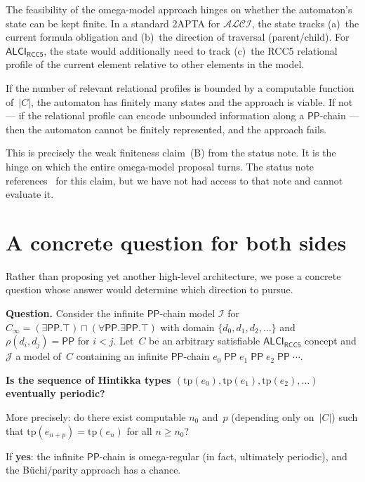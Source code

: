 \documentclass[11pt]{article}
\newcommand{\ALCIRCC}{\mathsf{ALCI}_{\mathsf{RCC5}}}
\newcommand{\ALCI}{\mathcal{ALCI}}
\newcommand{\Pp}{\mathsf{PP}}
\begin{document}
The feasibility of the omega-model approach hinges on whether the
automaton's state can be kept finite.  In a standard 2APTA for
$\ALCI$, the state tracks (a)~the current formula obligation and
(b)~the direction of traversal (parent\slash child).  For
$\ALCIRCC$, the state would additionally need to track (c)~the
RCC5 relational profile of the current element relative to other
elements in the model.

If the number of relevant relational profiles is bounded by a
computable function of~$|C|$, the automaton has finitely many
states and the approach is viable.  If not --- if the relational
profile can encode unbounded information along a $\Pp$-chain ---
then the automaton cannot be finitely represented, and the approach
fails.

This is precisely the weak finiteness claim~(B) from the status
note.  It is the hinge on which the entire omega-model proposal
turns.  The status note references~\cite{GPT2026Bound} for this
claim, but we have not had access to that note and cannot evaluate
it.

\section{A concrete question for both sides}

Rather than proposing yet another high-level architecture, we pose
a concrete question whose answer would determine which direction to
pursue.

\begin{mdframed}[backgroundcolor=lightaccent,linecolor=accent]
\textbf{Question.}\;
Consider the infinite $\Pp$-chain model $\mathcal{I}$ for
$C_\infty = (\exists\Pp.\top)\sqcap(\forall\Pp.\exists\Pp.\top)$
with domain $\{d_0, d_1, d_2, \ldots\}$ and $\rho(d_i,d_j) = \Pp$
for $i < j$.  Let~$C$ be an arbitrary satisfiable $\ALCIRCC$ concept
and $\mathcal{J}$ a model of~$C$ containing an infinite $\Pp$-chain
$e_0\;\Pp\;e_1\;\Pp\;e_2\;\Pp\;\cdots$.

\medskip
\textbf{Is the sequence of Hintikka types $(\mathrm{tp}(e_0),
\mathrm{tp}(e_1), \mathrm{tp}(e_2), \ldots)$ eventually periodic?}

\medskip
More precisely: do there exist computable $n_0$ and~$p$ (depending
only on~$|C|$) such that $\mathrm{tp}(e_{n+p}) = \mathrm{tp}(e_n)$
for all $n \ge n_0$?
\end{mdframed}

If \textbf{yes}: the infinite $\Pp$-chain is omega-regular (in
fact, ultimately periodic), and the B\"uchi\slash parity approach
has a chance.
\end{document}
